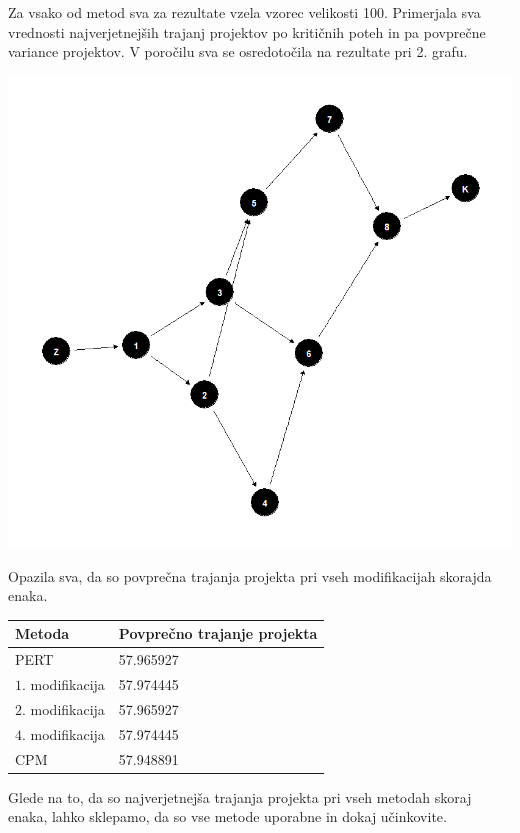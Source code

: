\documentclass[12pt, a4paper]{article}
\begin{document}
Za vsako od metod sva za rezultate vzela vzorec velikosti 100. Primerjala sva vrednosti najverjetnejših trajanj projektov po kritičnih poteh in pa povprečne variance projektov. V poročilu sva se osredotočila na rezultate pri 2. grafu.

\begin{center}
\includegraphics[scale=0.55]{2_graf.png}
\end{center}

Opazila sva, da so povprečna trajanja projekta pri vseh modifikacijah skorajda enaka. 
\begin{center}
\begin{tabular}{| l | l |}
\hline
Metoda & Povprečno trajanje projekta \\
\hline
PERT & 57.965927 \\
\hline
$1$. modifikacija & 57.974445 \\
\hline
$2$. modifikacija & 57.965927 \\
\hline
$4$. modifikacija & 57.974445 \\
\hline
CPM & 57.948891 \\
\hline
\end{tabular}
\end{center}
Glede na to, da so najverjetnejša trajanja projekta pri vseh metodah skoraj enaka, lahko sklepamo, da so vse metode uporabne in dokaj učinkovite.
\end{document}
